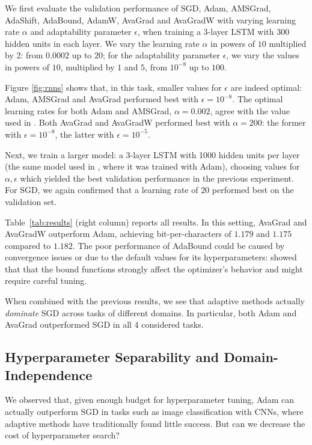 \documentclass{article}
\begin{document}
We first evaluate the validation performance of SGD, Adam, AMSGrad, AdaShift, AdaBound, AdamW,
AvaGrad and AvaGradW with varying learning rate $\alpha$ and adaptability
parameter $\epsilon$, when training a 3-layer LSTM with 300 hidden
units in each layer. We vary the learning rate $\alpha$ in powers of $10$ multiplied by 2: from $0.0002$ up to $20$; for the adaptability parameter $\epsilon$, we vary the values in powers of $10$, multiplied by $1$ and $5$, from $10^{-8}$ up to $100$.


Figure \ref{fig:rnns} shows that, in
this task, smaller values for $\epsilon$ are indeed optimal: Adam, AMSGrad and
AvaGrad performed best with $\epsilon = 10^{-8}$. The optimal learning rates for both Adam and AMSGrad, $\alpha = 0.002$, agree with the value used in \citet{awd}. Both AvaGrad and AvaGradW performed best with $\alpha = 200$: the former with $\epsilon=10^{-8}$, the latter with $\epsilon=10^{-5}$.

Next, we train a larger model: a 3-layer
LSTM with 1000 hidden units per layer (the same model used in \citet{awd},
where it was trained with Adam),
choosing values for $\alpha, \epsilon$ which yielded the best validation performance in
the previous experiment. For SGD, we again confirmed that a learning rate of $20$ performed best on the validation set. 

Table~\ref{tab:results} (right column) reports all
results. In this setting, AvaGrad and AvaGradW outperform Adam, achieving
bit-per-characters of $1.179$ and $1.175$ compared to $1.182$. The poor performance of AdaBound could be caused by convergence issues or due to the default values for its hyperparameters: \citet{adabound2} showed that that the bound functions strongly affect the optimizer's behavior and might require careful tuning.

When combined with the previous results, we see that adaptive methods actually \emph{dominate} SGD across tasks of different domains. In particular, both Adam and AvaGrad outperformed SGD in all 4 considered tasks.


\subsection{Hyperparameter Separability and Domain-Independence}

We observed that, given enough budget for hyperparameter tuning, Adam can actually outperform SGD in tasks such as image classification with CNNs, where adaptive methods have traditionally found little success. But can we decrease the cost of hyperparameter search?
\end{document}
